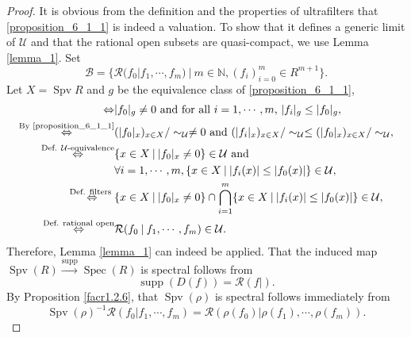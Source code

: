 \documentclass[8pt]{article}
\numberwithin{equation}{section}
\DeclareMathOperator{\supp}{supp}
\DeclareMathOperator{\Spec}{Spec}
\DeclareMathOperator{\Spv}{Spv}
\newcommand{\N}[0]{\mathbb{N}}
\newcommand{\U}[0]{\mathcal{U}}
\newcommand{\cR}[0]{\mathcal{R}}
\newcommand{\sep}[0]{\:|\:}
\newcommand{\ab}[1]{\vert #1 \vert}
\newcommand{\tand}[0]{\text{ and }}
\begin{document}
\begin{proof}
    It is obvious from the definition and the properties of ultrafilters that \eqref{proposition_6_1_1} is indeed a valuation. To show that it defines a generic limit of $\U$ and that the rational open subsets are quasi-compact, we use Lemma \ref{lemma_1}. Set 
    \begin{equation*}
        \mathcal{B} = \{\cR(f_0| f_1,\cdots,f_m)\sep m\in\N,(f_i)_{i=0}^m \in R^{m+1}\}.
    \end{equation*}
    Let $X=\Spv R$ and $g$ be the equivalence class of \eqref{proposition_6_1_1}, 
    \begin{align*}
        [g\in\cR(f_0|f_1,\cdots,f_m)]\Leftrightarrow&\ab{f_0}_g\not=0 \text{ and for all $i=1,\cdots,m$, $\ab{f_i}_g\leq \ab{f_0}_g$},\\
        \stackrel{\text{By \eqref{proposition_6_1_1}}}{\Leftrightarrow}& (\ab{f_0}_x)_{x\in X}/\sim_\U \not=0\text{ and }(\ab{f_i}_x)_{x\in X}/\sim_\U\leq (\ab{f_0}_x)_{x\in X}/\sim_\U,\\
        \stackrel{\substack{\text{Def. $\U$-equivalence}}}{\Leftrightarrow}& \{x\in X\sep \ab{f_0}_x\not=0\}\in\U\tand\\
        &\forall i=1,\cdots,m,\{x\in X\sep \ab{f_i(x)}\leq \vert f_0(x)\vert\}\in\U,\\
        \stackrel{\text{Def. filters }}{\Leftrightarrow}& \{x\in X\sep \ab{f_0}_x\not=0\}\cap\bigcap_{i=1}^m \{x\in X\sep \ab{f_i(x)}\leq\ab{f_0(x)}\}\in\U,\\
        \stackrel{\text{Def. rational open}}{\Leftrightarrow}&\cR(f_0\sep f_1,\cdots,f_m)\in\U.
    \end{align*}
    Therefore, Lemma \ref{lemma_1} can indeed be applied. That the induced map $\Spv(R)\stackrel{\supp}{\to}\Spec(R)$ is spectral follows from 
    \begin{equation*}
        \supp(D(f)) = \cR(f|).
    \end{equation*}
    By Proposition \ref{facr1.2.6}, that $\Spv(\rho)$ is spectral follows immediately from 
    \begin{equation*}
        \Spv(\rho)^{-1}\cR(f_0|f_1,\cdots,f_m) = \cR(\rho(f_0)|\rho(f_1),\cdots,\rho(f_m)).
    \end{equation*}
\end{proof}
\end{document}
